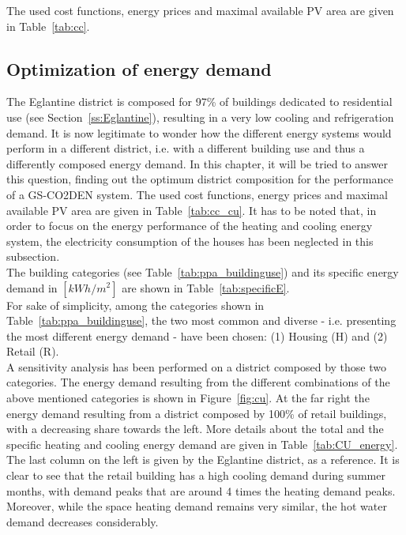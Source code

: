 \documentclass{article}
\begin{document}
The used cost functions, energy prices and maximal available PV area are given in Table~\ref{tab:cc}.

\newpage
\subsection{Optimization of energy demand}

The Eglantine district is composed for 97\% of buildings dedicated to residential use (see Section~\ref{ss:Eglantine}), resulting in a very low cooling and refrigeration demand. It is now legitimate to wonder how the different energy systems would perform in a different district, i.e. with a different building use and thus a differently composed energy demand. In this chapter, it will be tried to answer this question, finding out the optimum district composition for the performance of a GS-CO2DEN system. The used cost functions, energy prices and maximal available PV area are given in Table~\ref{tab:cc_cu}. It has to be noted that, in order to focus on the energy performance of the heating and cooling energy system, the electricity consumption of the houses has been neglected in this subsection.\\ 



The building categories (see Table~\ref{tab:ppa_buildinguse}) and its specific energy demand in $[kWh/m^2]$ are shown in Table~\ref{tab:specificE}.\\



For sake of simplicity, among the categories shown in Table~\ref{tab:ppa_buildinguse}, the two most common and diverse - i.e. presenting the most different energy demand - have been chosen: (1) Housing (H) and (2) Retail (R). \\

A sensitivity analysis has been performed on a district composed by those two categories. The energy demand resulting from the different combinations of the above mentioned categories is shown in Figure~\ref{fig:cu}. At the far right the energy demand resulting from a district composed by 100\% of retail buildings, with a decreasing share towards the left. More details about the total and the specific heating and cooling energy demand are given in Table~\ref{tab:CU_energy}. The last column on the left is given by the Eglantine district, as a reference. It is clear to see that the retail building has a high cooling demand during summer months, with demand peaks that are around 4 times the heating demand peaks. Moreover, while the space heating demand remains very similar, the hot water demand decreases considerably.
\end{document}
